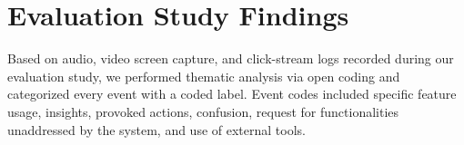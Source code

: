 \section{Evaluation Study Findings\label{sec:eval_findings}}
Based on audio, video screen capture, 
and click-stream logs recorded 
during our evaluation study, 
we performed thematic analysis via open coding
and categorized every event with a coded label. 
Event codes included specific feature usage, 
insights, 
provoked actions, confusion, 
request for functionalities unaddressed 
by the system, and use of external tools.
